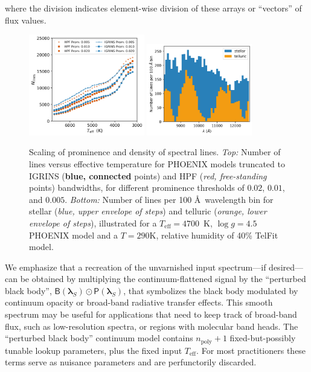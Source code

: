 \documentclass[twocolumn]{aastex631}
\begin{document}
where the division indicates element-wise division of these arrays or ``vectors'' of flux values.


\begin{figure}[hbt!]
    \centering
    \includegraphics[width=0.45\textwidth]{figures/N_lines_vs_Teff_prom.png}
    \includegraphics[width=0.41\textwidth]{figures/line_density_demo.png}
    \caption{Scaling of prominence and density of spectral lines.
        \emph{Top:} Number of lines versus effective temperature for PHOENIX models truncated to IGRINS (\textbf{blue, connected} points) and HPF (\emph{red, free-standing} points) bandwidths, for different prominence thresholds of $0.02$, $0.01$, and $0.005$.
        \emph{Bottom:} Number of lines per 100 \AA\ wavelength bin for stellar (\emph{blue, upper envelope of steps}) and telluric (\emph{orange, lower envelope of steps}), illustrated for a $T_\mathrm{eff}=4700$~K, $\log{g}=4.5$ PHOENIX model and a $T=290 \mathrm{K}$, relative humidity of 40\% TelFit model.}
    \label{fig_Nlines_vs_teff}
\end{figure}



We emphasize that a recreation of the unvarnished input spectrum---if desired---can be obtained by multiplying the continuum-flattened signal by the ``perturbed black body'', $\mathsf{B}(\bm{\lambda}_S)\odot \mathsf{P}(\bm{\lambda}_S)$, that symbolizes the black body modulated by continuum opacity or broad-band radiative transfer effects. This smooth spectrum may be useful for applications that need to keep track of broad-band flux, such as low-resolution spectra, or regions with molecular band heads. The ``perturbed black body'' continuum model contains $n_{\mathrm{poly}}+1$ fixed-but-possibly tunable lookup parameters, plus the fixed input $T_{\mathrm{eff}}$.  For most practitioners these terms serve as nuisance parameters and are perfunctorily discarded.
\end{document}
